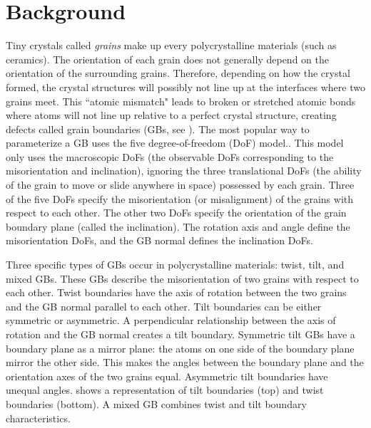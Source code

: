 \documentclass[twoside,senior]{BYUPhys}
\begin{document}
\chapter{Background\label{background}}
Tiny crystals called \emph{grains} make up every polycrystalline materials (such as ceramics).  The orientation of each grain does not generally depend on the orientation of the surrounding grains. Therefore, depending on how the crystal formed,\cite{callister2003} the crystal structures will possibly not line up at the interfaces where two grains meet.  This ``atomic mismatch"\cite{callister2003} leads to broken or stretched atomic bonds where atoms will not line up relative to a perfect crystal structure, creating defects called grain boundaries (GBs, see ). The most popular way to parameterize a GB uses the five degree-of-freedom (DoF) model.\cite{patala2013, lejcek2010, homer2015, bulatov2014, harbison2015, rohrer2011}.  This model only uses the macroscopic DoFs (the observable DoFs corresponding to the misorientation and inclination), ignoring the three translational DoFs (the ability of the grain to move or slide anywhere in space) possessed by each grain.  Three of the five DoFs specify the misorientation (or misalignment) of the grains with respect to each other.  The other two DoFs specify the orientation of the grain boundary plane (called the inclination).  The rotation axis and angle define the misorientation DoFs, and the GB normal defines the inclination DoFs.\cite{lejcek2010}

Three specific types of GBs occur in polycrystalline materials: twist, tilt, and mixed GBs.\cite{lejcek2010, rohrer2011}  These GBs describe the misorientation of two grains with respect to each other.  Twist boundaries have the axis of rotation between the two grains and the GB normal parallel to each other. Tilt boundaries can be either symmetric or asymmetric.  A perpendicular relationship between the axis of rotation and the GB normal creates a tilt boundary.  Symmetric tilt GBs have a boundary plane as a mirror plane: the atoms on one side of the boundary plane mirror the other side.  This makes the angles between the boundary plane and the orientation axes of the two grains equal. Asymmetric tilt boundaries have unequal angles.   shows a representation of tilt boundaries (top) and twist boundaries (bottom).  A mixed GB combines twist and tilt boundary characteristics.
\end{document}
